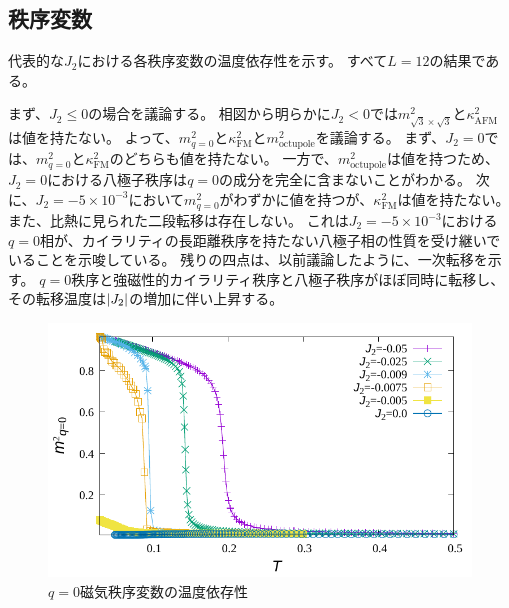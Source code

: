 \documentclass[12pt,titlepage,dvipdfmx]{jarticle}
\begin{document}
%

\newpage

\subsection{秩序変数}
代表的な$J_2$における各秩序変数の温度依存性を示す。
すべて$L=12$の結果である。

まず、$J_2\le0$の場合を議論する。
相図から明らかに$J_2<0$では$m^2_{\sqrt{3}\times\sqrt{3}}$と$\kappa^2_{\mathrm{AFM}}$は値を持たない。
よって、$m^2_{q=0}$と$\kappa^2_{\mathrm{FM}}$と$m^2_{\mathrm{octupole}}$を議論する。
まず、$J_2=0$では、$m^2_{q=0}$と$\kappa^2_{\mathrm{FM}}$のどちらも値を持たない。
一方で、$m^2_{\mathrm{octupole}}$は値を持つため、$J_2=0$における八極子秩序は$q=0$の成分を完全に含まないことがわかる。
次に、$J_2=-5\times10^{-3}$において$m^2_{q=0}$がわずかに値を持つが、$\kappa^2_{\mathrm{FM}}$は値を持たない。
また、比熱に見られた二段転移は存在しない。
これは$J_2=-5\times10^{-3}$における$q=0$相が、カイラリティの長距離秩序を持たない八極子相の性質を受け継いでいることを示唆している。
残りの四点は、以前議論したように、一次転移を示す。
$q=0$秩序と強磁性的カイラリティ秩序と八極子秩序がほぼ同時に転移し、その転移温度は$\abs{J_2}$の増加に伴い上昇する。
\begin{figure}[H]
   \centering
   \includegraphics[width=12cm]{figure/mq_q0.pdf}
   \caption{$q=0$磁気秩序変数の温度依存性}
\end{figure}
\end{document}

